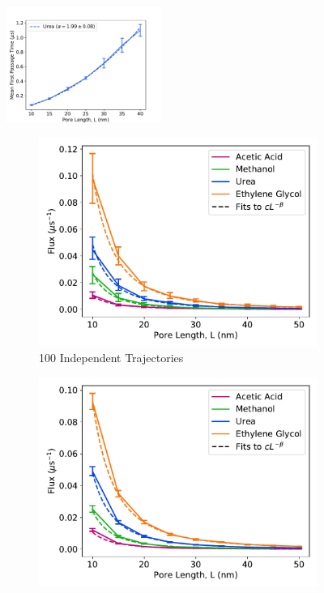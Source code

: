 \documentclass{article}
\begin{document}
  \begin{figure}
  \centering
  \includegraphics[width=0.45\textwidth]{mfpt_curves_brownian.pdf}
  \caption{}\label{fig:mfpt_curve_brownian}
  \end{figure}
  \begin{figure}
  \centering
  \begin{subfigure}{0.45\textwidth}
  \includegraphics[width=\textwidth]{flux_curves_N100.pdf}
  \caption{100 Independent Trajectories}\label{fig:N100}
  \end{subfigure}
  \begin{subfigure}{0.45\textwidth}
  \includegraphics[width=\textwidth]{flux_curves_N1000.pdf}

\end{subfigure}
\end{figure}
\end{document}
